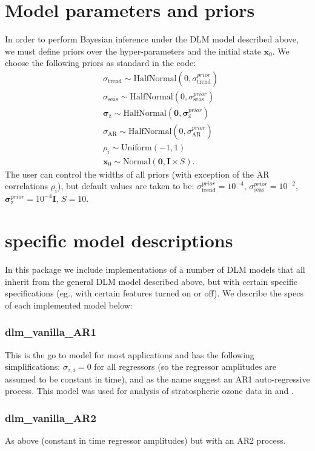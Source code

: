 \documentclass[a4paper, oneside, final]{scrartcl}
\begin{document}
\section{Model parameters and priors}
%
In order to perform Bayesian inference under the DLM model described above, we must define priors over the hyper-parameters and the
initial state $\mathbf{x}_0$. We choose the following priors as standard in the code:
\begin{align}
&\sigma_\mathrm{trend} \sim \mathrm{HalfNormal}(0, \sigma_\mathrm{trend}^{prior}) \nonumber \\
&\sigma_\mathrm{seas} \sim \mathrm{HalfNormal}(0, \sigma_\mathrm{seas}^{prior}) \nonumber \\
&\boldsymbol{\sigma}_\mathrm{z} \sim \mathrm{HalfNormal}(\mathbf{0}, \boldsymbol{\sigma}_\mathrm{z}^{prior}) \nonumber \\
&\sigma_\mathrm{AR} \sim \mathrm{HalfNormal}(0, \sigma_\mathrm{AR}^{prior}) \nonumber \\
&\rho_i  \sim \mathrm{Uniform}(-1, 1) \nonumber \\
&\mathbf{x}_0 \sim \mathrm{Normal}(\mathbf{0}, \mathbf{I}\times S).
\end{align}
The user can control the widths of all priors (with exception of the AR correlations $\rho_i$), but default values are taken to be: $\sigma_\mathrm{trend}^{prior} = 10^{-4}$, $\sigma_\mathrm{seas}^{prior} = 10^{-2}$, $\boldsymbol{\sigma}_\mathrm{z}^{prior} = 10^{-4}\mathbf{I}$, $S=10$.
%
\section{specific model descriptions}
%
In this package we include implementations of a number of DLM models that all inherit from the general DLM model described above, but with certain specific specifications (eg., with certain features turned on or off). We describe the specs of each implemented model below:
%
\subsubsection*{dlm\_vanilla\_AR1}
This is the go to model for most applications and has the following simplifications: $\sigma_{z,i} = 0$ for all regressors (so the regressor amplitudes are assumed to be constant in time), and as the name suggest an AR1 auto-regressive process. This model was used for analysis of stratospheric ozone data in \citet{ball2017} and \citet{ball2018}.
%
\subsubsection*{dlm\_vanilla\_AR2}
As above (constant in time regressor amplitudes) but with an AR2 process.
%
\end{document}
